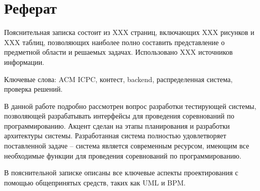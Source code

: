 \chapter*{Реферат}
Пояснительная записка состоит из XXX страниц, включающих XXX рисунков и XXX таблиц,
позволяющих наиболее полно составить представление о предметной области и решаемых задачах.
Использовано XXX источников информации.

Ключевые слова: ACM ICPC, контест, backend, распределенная система, проверка решений.

В данной работе подробно рассмотрен вопрос разработки тестирующей системы,
позволяющей разрабатывать интерфейсы для проведения соревнований по программированию.
Акцент сделан на этапы планирования и разработки архитектуры системы.
Разработанная система полностью удовлетворяет поставленной задаче –
система является современным ресурсом, имеющим все необходимые функции
для проведения соревнований по программированию.

В пояснительной записке описаны все ключевые аспекты проектирования
с помощью общепринятых средств, таких как UML и BPM.

